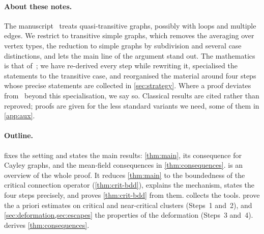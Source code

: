 \paragraph{About these notes.}
The manuscript~\cite{Ope26} treats quasi-transitive graphs, possibly with loops and multiple edges.
We restrict to transitive simple graphs, which removes the averaging over vertex types, the reduction
to simple graphs by subdivision and several case distinctions, and lets the main line of the argument
stand out. The mathematics is that of~\cite{Ope26}; we have re-derived every step while rewriting it,
specialised the statements to the transitive case, and reorganised the material around four steps
whose precise statements are collected in \cref{sec:strategy}. Where a proof deviates from~\cite{Ope26}
beyond this specialisation, we say so. Classical results are cited rather than reproved; proofs are
given for the less standard variants we need, some of them in \cref{app:aux}.

\paragraph{Outline.}
 fixes the setting and states the main results:
\cref{thm:main}, its consequence for Cayley graphs, and the mean-field consequences in
\cref{thm:consequences}.  is an overview of the whole proof. It reduces
\cref{thm:main} to the boundedness of the critical connection operator (\cref{thm:crit-bdd}), explains
the mechanism, states the four steps precisely, and proves \cref{thm:crit-bdd} from them.
 collects the tools.  prove the a
priori estimates on critical and near-critical clusters (Steps~1 and~2), and
\cref{sec:deformation,sec:escapes} the properties of the deformation (Steps~3 and~4).
 derives \cref{thm:consequences}.

